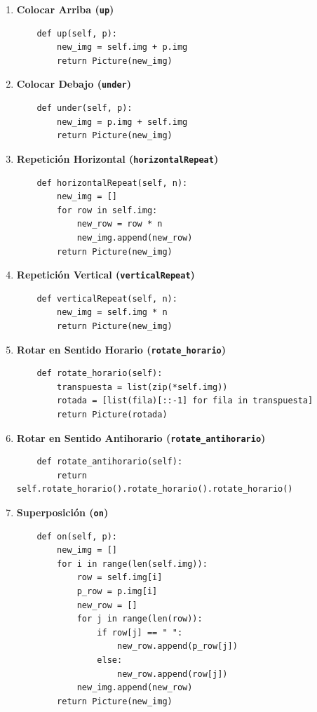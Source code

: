 \begin{enumerate}
    \item \textbf{Colocar Arriba (\texttt{up})}
    \begin{lstlisting}
    def up(self, p):
        new_img = self.img + p.img
        return Picture(new_img)
    \end{lstlisting}

    \item \textbf{Colocar Debajo (\texttt{under})}
    \begin{lstlisting}
    def under(self, p):
        new_img = p.img + self.img
        return Picture(new_img)
    \end{lstlisting}

    \item \textbf{Repetición Horizontal (\texttt{horizontalRepeat})}
    \begin{lstlisting}
    def horizontalRepeat(self, n):
        new_img = []
        for row in self.img:
            new_row = row * n
            new_img.append(new_row)
        return Picture(new_img)
    \end{lstlisting}

    \item \textbf{Repetición Vertical (\texttt{verticalRepeat})}
    \begin{lstlisting}
    def verticalRepeat(self, n):
        new_img = self.img * n
        return Picture(new_img)
    \end{lstlisting}

    \item \textbf{Rotar en Sentido Horario (\texttt{rotate\_horario})}
    \begin{lstlisting}
    def rotate_horario(self):
        transpuesta = list(zip(*self.img))
        rotada = [list(fila)[::-1] for fila in transpuesta]
        return Picture(rotada)
    \end{lstlisting}

    \item \textbf{Rotar en Sentido Antihorario (\texttt{rotate\_antihorario})}
    \begin{lstlisting}
    def rotate_antihorario(self):
        return self.rotate_horario().rotate_horario().rotate_horario()
    \end{lstlisting}

    \item \textbf{Superposición (\texttt{on})}
    \begin{lstlisting}
    def on(self, p):
        new_img = []
        for i in range(len(self.img)):
            row = self.img[i]
            p_row = p.img[i]
            new_row = []
            for j in range(len(row)):
                if row[j] == " ":
                    new_row.append(p_row[j])
                else:
                    new_row.append(row[j])
            new_img.append(new_row)
        return Picture(new_img)
    \end{lstlisting}


\end{enumerate}

